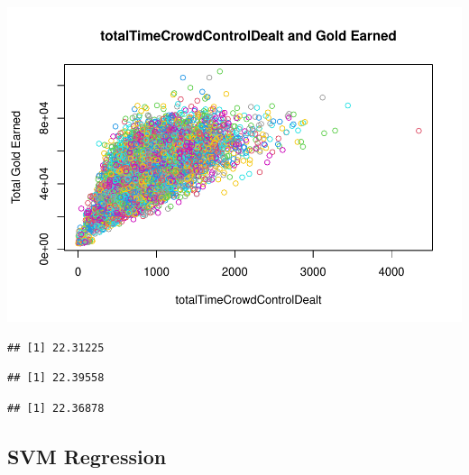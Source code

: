 \documentclass[
]{article}
\newenvironment{Shaded}{\begin{snugshade}}{\end{snugshade}}
\newcommand{\FunctionTok}[1]{\textcolor[rgb]{0.00,0.00,0.00}{#1}}
\newcommand{\NormalTok}[1]{#1}
\newcommand{\SpecialCharTok}[1]{\textcolor[rgb]{0.00,0.00,0.00}{#1}}
\begin{document}
\includegraphics{Regression_files/figure-latex/unnamed-chunk-5-9.pdf}

\begin{Shaded}
\end{Shaded}

\begin{verbatim}
## [1] 22.31225
\end{verbatim}

\begin{Shaded}
\end{Shaded}

\begin{verbatim}
## [1] 22.39558
\end{verbatim}

\begin{Shaded}
\end{Shaded}

\begin{verbatim}
## [1] 22.36878
\end{verbatim}

\hypertarget{svm-regression}{%
\subsection{SVM Regression}\label{svm-regression}}
\end{document}
